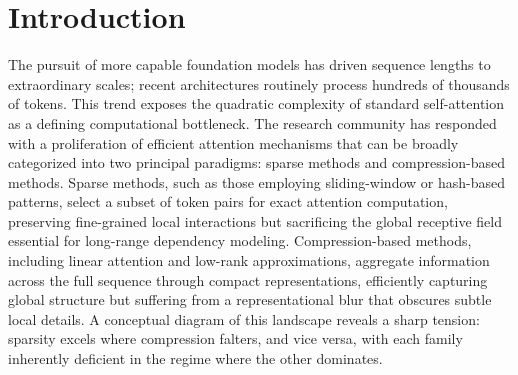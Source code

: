 \documentclass{article}
\begin{document}
\section{Introduction}
The pursuit of more capable foundation models has driven sequence lengths to extraordinary scales; recent architectures routinely process hundreds of thousands of tokens. This trend exposes the quadratic complexity of standard self-attention as a defining computational bottleneck. The research community has responded with a proliferation of efficient attention mechanisms that can be broadly categorized into two principal paradigms: sparse methods and compression-based methods. Sparse methods, such as those employing sliding-window or hash-based patterns, select a subset of token pairs for exact attention computation, preserving fine-grained local interactions but sacrificing the global receptive field essential for long-range dependency modeling. Compression-based methods, including linear attention and low-rank approximations, aggregate information across the full sequence through compact representations, efficiently capturing global structure but suffering from a representational blur that obscures subtle local details. A conceptual diagram of this landscape reveals a sharp tension: sparsity excels where compression falters, and vice versa, with each family inherently deficient in the regime where the other dominates.
\end{document}
